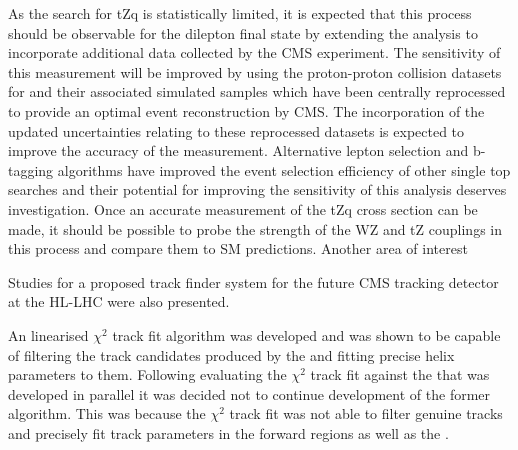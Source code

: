 As the search for tZq is statistically limited, it is expected that this process should be observable for the dilepton final state by extending the analysis to incorporate additional data collected by the CMS experiment.
The sensitivity of this measurement will be improved by using the proton-proton collision datasets for and their associated simulated samples which have been centrally reprocessed to provide an optimal event reconstruction by CMS.
The incorporation of the updated uncertainties relating to these reprocessed datasets is  expected to improve the accuracy of the measurement.
Alternative lepton selection and b-tagging algorithms have improved the event selection efficiency of other single top searches and their potential for improving the sensitivity of this analysis deserves investigation.
Once an accurate measurement of the tZq cross section can be made, it should be possible to probe  the strength of the WZ and tZ couplings in this process and compare them to SM predictions.
Another area of interest

%


Studies  
 for a proposed track finder system for the future CMS tracking detector at the HL-LHC were also presented.

An linearised $\chi^{2}$ track fit algorithm was developed and was shown to be capable of filtering the track candidates produced by the \HT and fitting precise helix parameters to them.
Following evaluating the $\chi^{2}$ track fit against the \KF that was developed in parallel it was decided not to continue development of the former algorithm.
This was because the $\chi^{2}$ track fit was not able to filter genuine tracks and precisely fit track parameters in the forward regions as well as the \KF.

